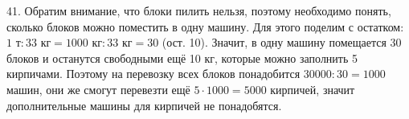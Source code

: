 41. Обратим внимание, что блоки пилить нельзя, поэтому необходимо понять, сколько блоков можно поместить в одну машину. Для этого поделим с остатком:
$1\text{ т}:33\text{ кг}=1000\text{ кг}:33\text{ кг}=30$ (ост. 10). Значит, в одну машину помещается 30 блоков и останутся свободными ещё 10 кг, которые можно заполнить 5 кирпичами. Поэтому на перевозку всех блоков понадобится $30000:30=1000$ машин, они же смогут перевезти ещё $5\cdot1000=5000$ кирпичей, значит дополнительные машины для кирпичей не понадобятся.\\
